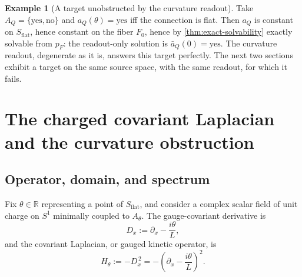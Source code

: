 \documentclass[11pt,reqno]{amsart}
\theoremstyle{plain}
\theoremstyle{definition}
\newtheorem{example}[theorem]{Example}
\newcommand{\Rr}{\mathbb{R}}
\newcommand{\Src}{S}
\newcommand{\Dx}{D_{x}}
\begin{document}
\begin{example}[A target unobstructed by the curvature readout]\label{ex:unobstructed}
Take $A_Q=\{\text{yes},\text{no}\}$ and $a_Q(\theta)=\text{yes}$ iff the connection is flat. Then
$a_Q$ is constant on $\Src_{\mathrm{flat}}$, hence constant on the fiber $F_0$, hence by
\cref{thm:exact-solvability} exactly solvable from $p_F$: the readout-only solution is
$\bar a_Q(0)=\text{yes}$. The curvature readout, degenerate as it is, answers this target
perfectly. The next two sections exhibit a target on the same source space, with the same
readout, for which it fails.
\end{example}

\section{The charged covariant Laplacian and the curvature obstruction}\label{sec:spectrum}

\subsection{Operator, domain, and spectrum}

Fix $\theta\in\Rr$ representing a point of $\Src_{\mathrm{flat}}$, and consider a complex scalar
field of unit charge on $S^1$ minimally coupled to $A_\theta$. The gauge-covariant derivative is
\begin{equation}\label{eq:Dx}
\Dx:=\partial_x-\frac{i\theta}{L},
\end{equation}
and the covariant Laplacian, or gauged kinetic operator, is
\begin{equation}\label{eq:Htheta}
H_\theta:=-\Dx^{\,2}
=-\left(\partial_x-\frac{i\theta}{L}\right)^{\!2}.
\end{equation}
\end{document}
